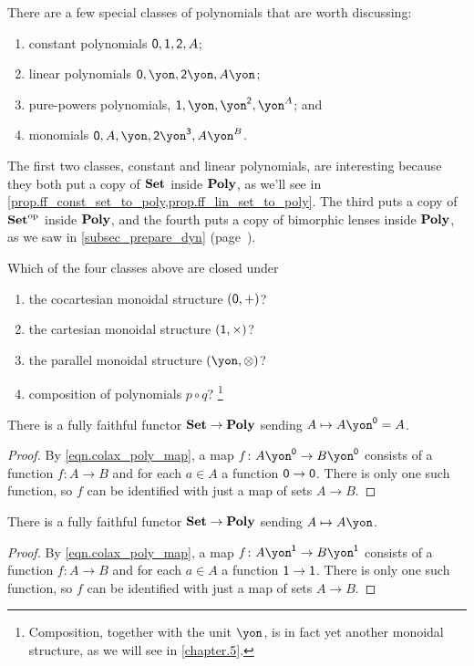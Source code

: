\documentclass[Book-Poly]{subfiles}
\begin{document}
There are a few special classes of polynomials that are worth discussing: 
\begin{enumerate}
	\item constant polynomials $\textsf{0},\textsf{1},\textsf{2},A$; 
	\item linear polynomials $\0,\yon, \2\yon, A\yon$;
	\item pure-powers polynomials, $\1, \yon, \yon^\2, \yon^A$; and 
	\item monomials $\0, A, \yon, \2\yon^\3, A\yon^B$.
\end{enumerate}
The first two classes, constant and linear polynomials, are interesting because they both put a copy of $\textbf{Set}$ inside $\textbf{Poly}$, as we'll see in \cref{prop.ff_const_set_to_poly,prop.ff_lin_set_to_poly}. The third puts a copy of $\textbf{Set}^{\textnormal{op}}$ inside $\textbf{Poly}$, and the fourth puts a copy of bimorphic lenses inside $\textbf{Poly}$, as we saw in \cref{subsec_prepare_dyn} (page~\pageref{page.bimorphic_lens}).

\begin{exercise}
Which of the four classes above are closed under
\begin{enumerate}
	\item the cocartesian monoidal structure $(\textsf{0},+)$?
	\item the cartesian monoidal structure $(\textsf{1},\times)$?
	\item the parallel monoidal structure $(\yon,\otimes)$?
	\item composition of polynomials $p\circ q$?%
	\footnote{Composition, together with the unit $\yon$, is in fact yet another monoidal structure, as we will see in \cref{chapter.5}.}
\qedhere
\end{enumerate}
\end{exercise}

\begin{proposition}\label{prop.ff_const_set_to_poly}
There is a fully faithful functor $\textbf{Set}\to\textbf{Poly}$ sending $A\mapsto A\yon^\0=A$.
\end{proposition}
\begin{proof}
By \cref{eqn.colax_poly_map}, a map $f\colon A\yon^\0\to B\yon^\0$ consists of a function $f\colon A\to B$ and for each $a\in A$ a function $\textsf{0}\to\textsf{0}$. There is only one such function, so $f$ can be identified with just a map of sets $A\to B$.
\end{proof}

\begin{proposition}\label{prop.ff_lin_set_to_poly}
There is a fully faithful functor $\textbf{Set}\to\textbf{Poly}$ sending $A\mapsto A\yon$.
\end{proposition}
\begin{proof}
By \cref{eqn.colax_poly_map}, a map $f\colon A\yon^\1\to B\yon^\1$ consists of a function $f\colon A\to B$ and for each $a\in A$ a function $\textsf{1}\to\textsf{1}$. There is only one such function, so $f$ can be identified with just a map of sets $A\to B$.
\end{proof}
\end{document}
